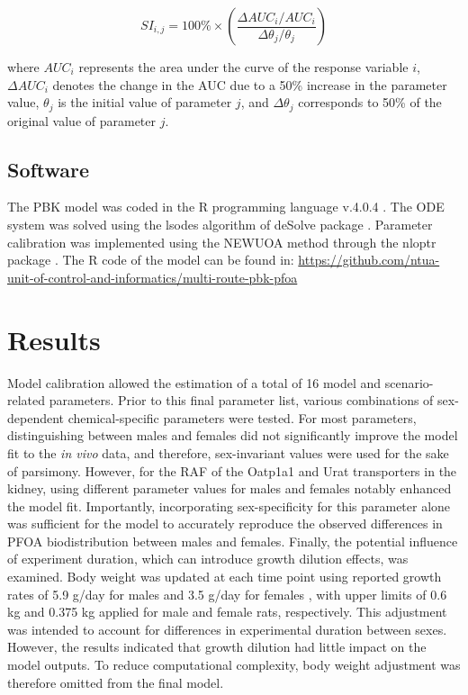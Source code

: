 \documentclass[preprint,12pt,authoryear]{elsarticle}
\begin{document}
\begin{equation}
SI_{i,j} = 100\% \times \left( \frac{\Delta AUC_i / AUC_i}{\Delta \theta_j / \theta_j} \right)
\end{equation}

\noindent
where $AUC_i$ represents the area under the curve of the response variable $i$, $\Delta AUC_i$ denotes the change in the AUC due to a 50\% increase in the parameter value, $\theta_j$ is the initial value of parameter $j$, and $\Delta \theta_j$ corresponds to 50\% of the original value of parameter $j$.





\subsection{Software}
The PBK model was coded in the R programming language v.4.0.4 \citep{rcore_2021}. The ODE system was solved using the lsodes algorithm of deSolve package \citep{soetaert_2010}. Parameter calibration was implemented using the NEWUOA method \citep{powell_2006} through the nloptr package \citep{johnson_2025}. The R code of the model can be found in: \url{https://github.com/ntua-unit-of-control-and-informatics/multi-route-pbk-pfoa} 


\section{Results}

Model calibration allowed the estimation of a total of 16 model and scenario-related parameters.  Prior to this final parameter list, various combinations of sex-dependent chemical-specific parameters were tested. For most parameters, distinguishing between males and females did not significantly improve the model fit to the \textit{in vivo} data, and therefore, sex-invariant values were used for the sake of parsimony. However, for the RAF of the Oatp1a1  and Urat transporters in the kidney, using different parameter values for males and females notably enhanced the model fit. Importantly, incorporating sex-specificity for this parameter alone was sufficient for the model to accurately reproduce the observed differences in PFOA biodistribution between males and females. Finally, the potential influence of experiment duration, which can introduce growth dilution effects, was examined. Body weight was updated at each time point using reported growth rates of 5.9 g/day for males and 3.5 g/day for females \citep{ghasemi_2021}, with upper limits of 0.6 kg and 0.375 kg applied for male and female rats, respectively. This adjustment was intended to account for differences in experimental duration between sexes. However, the results indicated that growth dilution had little impact on the model outputs. To reduce computational complexity, body weight adjustment was therefore omitted from the final model.
\end{document}
